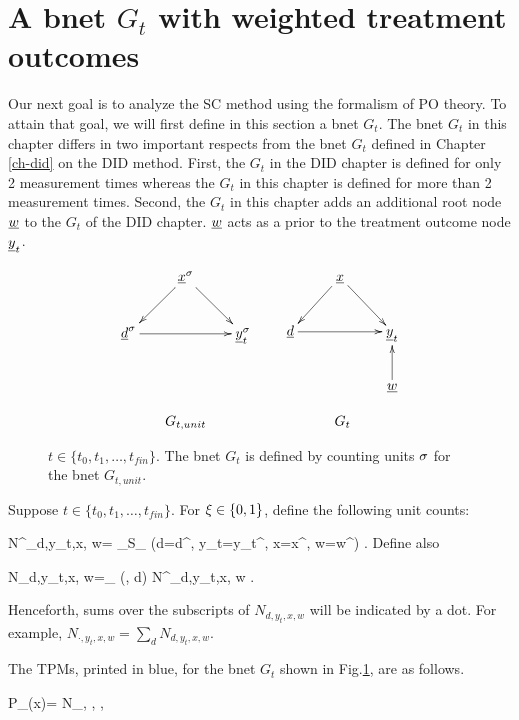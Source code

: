 \section{A bnet $G_t$ with weighted 
treatment outcomes}

Our next goal is to
analyze  the SC method using
the formalism of PO theory.
To attain that goal,  
we will first define
in this section a bnet
$G_t$. The bnet $G_t$ 
in this chapter differs
in two important respects from the bnet
$G_t$ defined in Chapter \ref{ch-did}
on the DID method.
First, the $G_t$ in the DID chapter
is defined for only 2 measurement times
whereas the $G_t$ in
this chapter is defined for
 more than 2  measurement times.
Second, the $G_t$ in this chapter 
adds an additional
root node ${\underline{w}}$ to
the $G_t$ of the DID chapter.
${\underline{w}}$ acts as a prior to the
treatment outcome node ${\underline{y}}_t$.



\begin{figure}[h!]
$$
\begin{array}{ccc}
\xymatrix{
&\rvx^\s\ar[dl]\ar[dr]
\\
\rvd^\s\ar[rr]&
&\rvy_t^\s
}
&&
\xymatrix{
&\rvx\ar[dl]\ar[dr]
\\
\rvd\ar[rr]&
&\rvy_t
\\
&&\rvw\ar[u]
}
\\
\\
G_{t, unit}&&G_t
\end{array}
$$
\caption{$t\in \{t_0, t_1, \ldots, t_{fin}\}$.
The bnet $G_t$ is defined 
by counting units $\sigma$
for the bnet $G_{t, unit}$. 
} 
\label{fig-syn-con-G}
\end{figure}

 

Suppose $t\in \{t_0, t_1, \ldots, t_{fin}\}$.
For $\xi\in \{0,1\}$, define the 
following unit counts:


\beq
N^\xi_{d,y_t,x, w}=
\sum_{\s \in S_\xi}
\indi(d=d^\s, y_t=y_t^\xi,
 x=x^\s, w=w^\s)
\;.
\eeq
Define also

\beq
N_{d,y_t,x, w}=\sum_{\xi\in\bool}
\indi(\xi, d) 
N^\xi_{d,y_t,x, w}
\;.
\eeq

Henceforth,
sums over the subscripts of 
$N_{d,y_t,x, w}$ will
be indicated by a dot.
For example,
$N_{\cdot,y_t,x, w}
=
\sum_d N_{d,y_t,x, w}
$.

The TPMs,
printed in blue,
for the 
bnet
$G_t$
shown
in Fig.\ref{fig-syn-con-G},
are as follows.


\beq\color{blue}
P_{\rvx}(x)=  
{N_{\cdot, \cdot, \cdot, \cdot}}
\eeq
 
